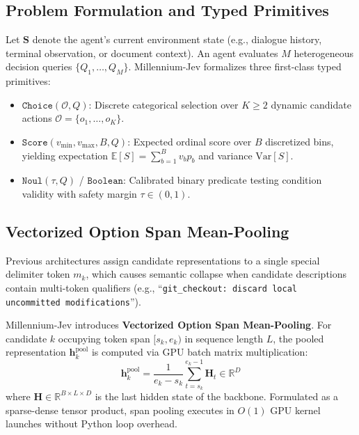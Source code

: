 \documentclass[11pt,a4paper]{article}
\begin{document}
\subsection{Problem Formulation and Typed Primitives}
Let $\mathbf{S}$ denote the agent's current environment state (e.g., dialogue history, terminal observation, or document context). An agent evaluates $M$ heterogeneous decision queries $\{Q_1, \dots, Q_M\}$. Millennium-Jev formalizes three first-class typed primitives:
\begin{itemize}
    \item $\texttt{Choice}(\mathcal{O}, Q)$: Discrete categorical selection over $K \ge 2$ dynamic candidate actions $\mathcal{O} = \{o_1, \dots, o_K\}$.
    \item $\texttt{Score}(v_{\min}, v_{\max}, B, Q)$: Expected ordinal score over $B$ discretized bins, yielding expectation $\mathbb{E}[S] = \sum_{b=1}^B v_b p_b$ and variance $\text{Var}[S]$.
    \item $\texttt{Noul}(\tau, Q)$ / $\texttt{Boolean}$: Calibrated binary predicate testing condition validity with safety margin $\tau \in (0, 1)$.
\end{itemize}

\subsection{Vectorized Option Span Mean-Pooling}
Previous architectures assign candidate representations to a single special delimiter token $m_k$, which causes semantic collapse when candidate descriptions contain multi-token qualifiers (e.g., ``\texttt{git\_checkout: discard local uncommitted modifications}'').

Millennium-Jev introduces \textbf{Vectorized Option Span Mean-Pooling}. For candidate $k$ occupying token span $[s_k, e_k)$ in sequence length $L$, the pooled representation $\mathbf{h}_k^{\text{pool}}$ is computed via GPU batch matrix multiplication:
\begin{equation}
\mathbf{h}_k^{\text{pool}} = \frac{1}{e_k - s_k} \sum_{t=s_k}^{e_k - 1} \mathbf{H}_t \in \mathbb{R}^D
\end{equation}
where $\mathbf{H} \in \mathbb{R}^{B \times L \times D}$ is the last hidden state of the backbone. Formulated as a sparse-dense tensor product, span pooling executes in $O(1)$ GPU kernel launches without Python loop overhead.
\end{document}
